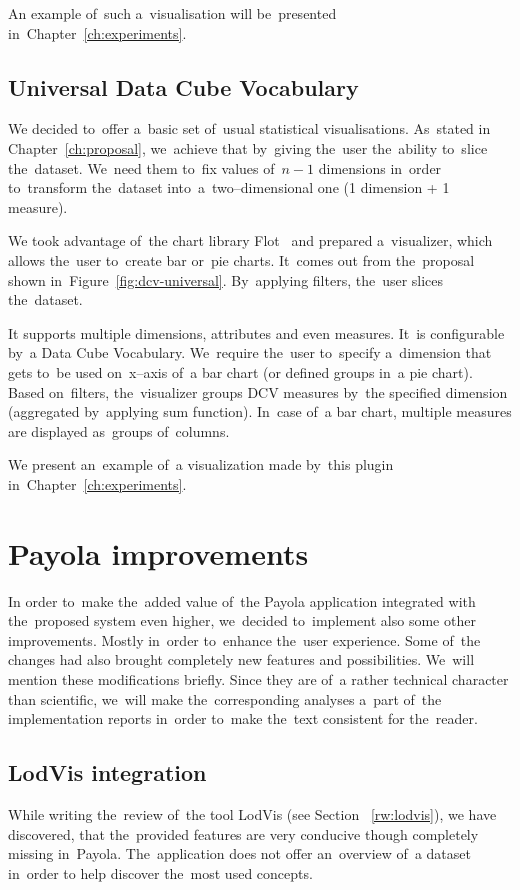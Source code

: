 An example of~such a~visualisation will be~presented in~Chapter~\ref{ch:experiments}.

\subsection{Universal Data Cube Vocabulary}
We decided to~offer a~basic set of~usual statistical visualisations. As~stated 
in Chapter~\ref{ch:proposal}, we~achieve that by~giving the~user the~ability to~slice the~dataset. We~need them to~fix values of~$n-1$ dimensions in~order to~transform the~dataset into~a~two--dimensional one (1 dimension + 1 measure).

We took advantage of~the chart library Flot~\cite{flot} and prepared a~visualizer, which allows the~user to~create bar or~pie charts. It~comes out from the~proposal shown in~Figure~\ref{fig:dcv-universal}. By~applying filters, the~user slices the~dataset.

It supports multiple dimensions, attributes and even measures. It~is 
configurable by~a Data Cube Vocabulary. We~require the~user to~specify a~dimension that gets to~be used on~x--axis of~a bar chart (or defined groups in~a 
pie chart). Based on~filters, the~visualizer groups DCV measures by~the specified 
dimension (aggregated by~applying sum function). In~case of~a bar chart, multiple measures are 
displayed as~groups of~columns.

We present an~example of~a visualization made by~this plugin in~Chapter~\ref{ch:experiments}.

\section{Payola improvements}
In order to~make the~added value of~the Payola application integrated with the~proposed system even higher, we~decided to~implement also some other
improvements. Mostly in~order to~enhance the~user experience. Some of~the changes
had also brought completely new features and possibilities. We~will mention 
these modifications briefly. Since they are of~a rather technical character 
than scientific, we~will make the~corresponding analyses a~part of~the 
implementation reports in~order to~make the~text consistent for the~reader.

\subsection{LodVis integration}
While writing the~review of~the tool LodVis (see Section ~\ref{rw:lodvis}), 
we have discovered, that the~provided features are very conducive though completely 
missing in~Payola. The~application does not offer an~overview of~a dataset in~order 
to help discover the~most used concepts.

